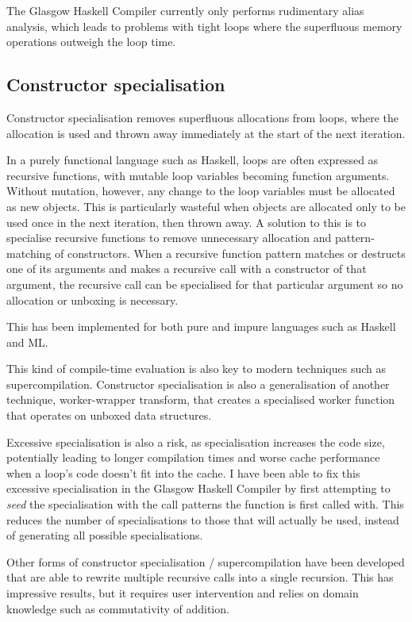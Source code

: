 The Glasgow Haskell Compiler currently only performs rudimentary alias analysis, which leads to problems with tight loops
where the superfluous memory operations outweigh the loop time.

\subsection{Constructor specialisation}

Constructor specialisation removes superfluous allocations from loops\cite{bechet1994limix},
where the allocation is used and thrown away immediately at the start of the next iteration.

In a purely functional language such as Haskell, loops are often expressed as recursive functions, with mutable loop variables becoming function arguments. 
Without mutation, however, any change to the loop variables must be allocated as new objects\cite{peyton2007call}.
This is particularly wasteful when objects are allocated only to be used once in the next iteration, then thrown away.
A solution to this is to specialise recursive functions to remove unnecessary allocation and pattern-matching of constructors.
When a recursive function pattern matches or destructs one of its arguments and makes a recursive call with a constructor of that argument,
the recursive call can be specialised for that particular argument so no allocation or unboxing is necessary.

This has been implemented for both pure and impure languages such as Haskell and ML\cite{thiemann1993avoiding, mogensen1993constructor}.

This kind of compile-time evaluation is also key to modern techniques such as supercompilation\cite{bolingbroke2011supercomp}.
Constructor specialisation is also a generalisation of another technique, worker-wrapper transform\cite{gill2009worker},
that creates a specialised worker function that operates on unboxed data structures.

Excessive specialisation is also a risk, as specialisation increases the code size, potentially leading to longer compilation times and worse cache performance when a loop's code doesn't fit into the cache.
I have been able to fix this excessive specialisation in the Glasgow Haskell Compiler by first attempting to \emph{seed} the specialisation with the call patterns the function is first called with.
This reduces the number of specialisations to those that will actually be used, instead of generating all possible specialisations.

Other forms of constructor specialisation / supercompilation have been developed that are able to rewrite multiple recursive calls into a single recursion\cite{burstall1977transformation}.
This has impressive results, but it requires user intervention and relies on domain knowledge such as commutativity of addition.



